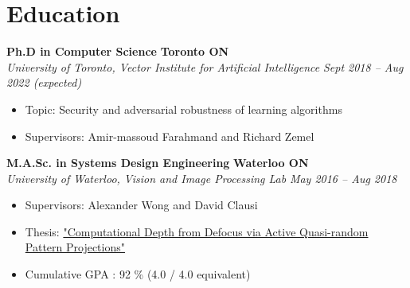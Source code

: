 \section*{Education}
\vspace{\postsubhead}
    \textbf{Ph.D in Computer Science}
    \hfill
    \textbf{Toronto ON}\\
    \textit{University of Toronto, Vector Institute for Artificial Intelligence}
    \hfill
    \textit{Sept 2018 -- Aug 2022 (expected)}
    \begin{itemize}
        \item Topic: Security and adversarial robustness of learning algorithms
        \item Supervisors: Amir-massoud Farahmand and Richard Zemel
    \end{itemize}
    \vspace{\interlist}
    
    \textbf{M.A.Sc. in Systems Design Engineering}
    \hfill
    \textbf{Waterloo ON}\\
    \textit{University of Waterloo, Vision and Image Processing Lab}
    \hfill
    \textit{May 2016 -- Aug 2018}
    \begin{itemize}
        \item Supervisors: Alexander Wong and David Clausi
        \item Thesis: \href{https://uwspace.uwaterloo.ca/handle/10012/13645}{"Computational Depth from Defocus via Active Quasi-random Pattern Projections"}
        \item Cumulative GPA : 92 \% (4.0 / 4.0 equivalent) 
    \end{itemize}
    \vspace{\interlist}

